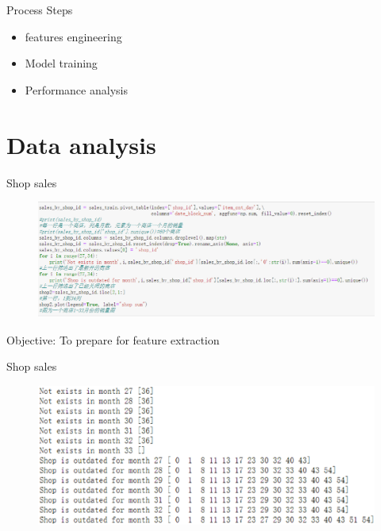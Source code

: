 \documentclass[
 size=14pt,
 paper=smartboard,  %
 mode=present, 		%
 display=slides, 	%
 style=tuliplab,  	%
 pauseslide,
 fleqn,leqno]{powerdot}
\begin{document}
\begin{slide}[toc=,bm=]{Process Steps}
  \begin{itemize}
    \item features engineering
    \item Model training
    \item Performance analysis
  \end{itemize}
\end{slide}

\section{Data analysis}

\begin{slide}[toc=,bm=]{Shop sales}
  \begin{figure}
    \includegraphics[scale=0.5]{picture/data_10.eps}
  \end{figure}
  \begin{center}
    Objective: To prepare for feature extraction
  \end{center}
\end{slide}


\begin{slide}[toc=,bm=]{Shop sales}
  \begin{figure}
    \includegraphics[scale=0.5]{picture/data_11.eps}
  \end{figure}
\end{slide}
\end{document}
